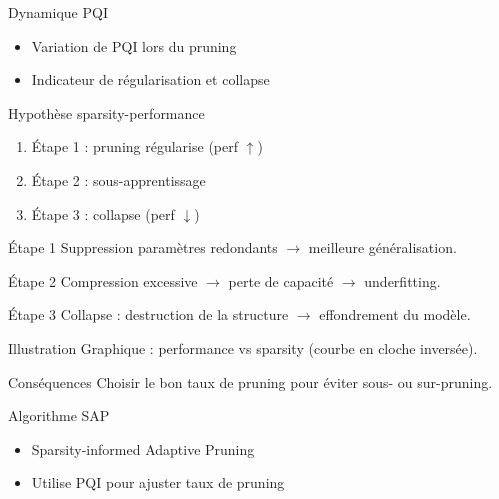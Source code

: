 \documentclass{beamer}
\begin{document}
\begin{frame}{Dynamique PQI}
\begin{itemize}
\item Variation de PQI lors du pruning
\item Indicateur de régularisation et collapse
\end{itemize}
\end{frame}

\begin{frame}{Hypothèse sparsity-performance}
\begin{enumerate}
\item Étape 1 : pruning régularise (perf $\uparrow$)
\item Étape 2 : sous-apprentissage
\item Étape 3 : collapse (perf $\downarrow$)
\end{enumerate}
\end{frame}

\begin{frame}{Étape 1}
Suppression paramètres redondants $\rightarrow$ meilleure généralisation.
\end{frame}

\begin{frame}{Étape 2}
Compression excessive $\rightarrow$ perte de capacité $\rightarrow$ underfitting.
\end{frame}

\begin{frame}{Étape 3}
Collapse : destruction de la structure $\rightarrow$ effondrement du modèle.
\end{frame}

\begin{frame}{Illustration}
Graphique : performance vs sparsity (courbe en cloche inversée).
\end{frame}

\begin{frame}{Conséquences}
Choisir le bon taux de pruning pour éviter sous- ou sur-pruning.
\end{frame}

\begin{frame}{Algorithme SAP}
\begin{itemize}
\item Sparsity-informed Adaptive Pruning
\item Utilise PQI pour ajuster taux de pruning
\end{itemize}
\end{frame}
\end{document}
